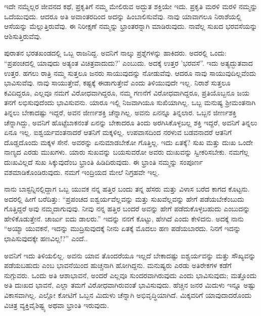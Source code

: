 ಇದೇ ನಮ್ಮೆಲ್ಲರ ಜೀವನದ ಕಥೆ, ಪ್ರಕೃತಿಗೆ ನಮ್ಮ ಮೇಲಿರುವ ಅದ್ಭುತ ಶಕ್ತಿಯೇ ಇದು. ಪ್ರಕೃತಿ ಮರಳಿ ಮರಳಿ ನಮ್ಮನ್ನು ಒದೆಯುವುದು. ಆದರೂ ಅತಿ ಅವಾಂತರದಿಂದ ಅದನ್ನು ಹಿಂಬಾಲಿಸುವೆವು. ನಾವು ಯಾವಾಗಲೂ ನಿರಾಶೆಯಲ್ಲಿ ಆಸೆಯನ್ನು ಮೆಲ್ಲುತ್ತಿರುವೆವು. ಈ ನಿರೀಕ್ಷಣೆ ನಮ್ಮನ್ನು ಭ್ರಾಂತರನ್ನಾಗಿ ಮಾಡಿರುವುದು. ನಾವೆಲ್ಲ ಸುಖದ ಭರವಸೆಯನ್ನು ಆಶಿಸುತ್ತಿರುವೆವು.

ಪುರಾತನ ಭರತಖಂಡದಲ್ಲಿ ಒಬ್ಬ ರಾಜನಿದ್ದ. ಅವನಿಗೆ ನಾಲ್ಕು ಪ್ರಶ್ನೆಗಳನ್ನು ಹಾಕಿದರು. ಅದರಲ್ಲಿ ಒಂದು: “ಪ್ರಪಂಚದಲ್ಲಿ ಯಾವುದು ಅತ್ಯಂತ ವಿಚಿತ್ರವಾದುದು?' ಎಂಬುದು. ಅದಕ್ಕೆ ಉತ್ತರ 'ಭರವಸೆ”. ಇದು ಅತ್ಯದ್ಭುತವಾದ ಉತ್ತರ. ಹಗಲು ರಾತ್ರಿ ನಮ್ಮ ಸುತ್ತಲೂ ಜನರು ಸಾಯುವುದನ್ನು ನೋಡುವೆವು. ಆದರೂ ನಾವು ಸಾಯುವುದಿಲ್ಲವೆಂದು ಭಾವಿಸುವೆವು. ನಾವು ಸಾಯುತ್ತೇವೆ, ಕಷ್ಟಕ್ಕೆ ಈಡಾಗುತ್ತೇವೆ ಎಂದು ತಿಳಿಯುವುದೇ ಇಲ್ಲ. ನಿರಾಶೆ ಸುತ್ತಲೂ ಕವಿದಿದ್ದರೂ, ಎಲ್ಲವೂ ನಮಗೆ ವಿರೋಧವಾಗಿದ್ದರೂ, ನಮ್ಮ ಗಣನೆಗೆ ವಿರೋಧವಾಗಿದ್ದರೂ, ಪ್ರತಿಯೊಬ್ಬನೂ ಜಯ ತನಗೆ ಲಭಿಸುವುದೆಂದು ಭಾವಿಸುವನು. ಯಾರೂ ಇಲ್ಲಿ ನಿಜವಾಗಿಯೂ ಸುಖಿಯಾಗಿಲ್ಲ. ಒಬ್ಬ ಮನುಷ್ಯ ಶ‍್ರೀಮಂತನಾಗಿ ತಿನ್ನಲು ಬೇಕಾದಷ್ಟು ಇದ್ದರೆ, ಅವನ ಜೀರ್ಣಶಕ್ತಿ ಚೆನ್ನಾಗಿಲ್ಲ. ಅವನು ಏನನ್ನೂ ತಿನ್ನಲಾರ. ಒಬ್ಬನ ಜೀರ್ಣಶಕ್ತಿ ಚೆನ್ನಾಗಿದ್ದು, ಅವನಿಗೆ ಹೊಟ್ಟೆಬಾಕನಂತೆ ಏನನ್ನು ಬೇಕಾದರೂ ತಿಂದು ಅರಗಿಸಿಕೊಳ್ಳಬಲ್ಲ ಶಕ್ತಿ ಇದ್ದರೆ, ಅವನಿಗೆ ತಿನ್ನಲು ಏನೂ ಇಲ್ಲ. ಐಶ್ವರ್ಯವಂತನಾದರೆ ಆತನಿಗೆ ಮಕ್ಕಳಿಲ್ಲ. ಉಪವಾಸದಿಂದ ನರಳುವ ಬಡವನಾದರೆ ಆತನಿಗೆ ದೊಡ್ಡದೊಂದು ಮಕ್ಕಳ ಸೇನೆ. ಅವರನ್ನು ಏನುಮಾಡಬೇಕೋ ಗೊತ್ತಿಲ್ಲ. ಇದು ಏತಕ್ಕೆ? ಸುಖ ಮತ್ತು ದುಃಖ ಒಂದೇ ನಾಣ್ಯದ ಎರಡು ಮುಖಗಳು. ಯಾರು ಸುಖವನ್ನು ಬಯಸುವರೋ ಅವರು ದುಃಖವನ್ನು ಸ್ವೀಕರಿಸಬೇಕು. ನಮಗೆಲ್ಲ ದುಃಖವಿಲ್ಲದೆ ಸುಖ ಸಿಕ್ಕುವುದೆಂಬ ಭ್ರಾಂತಿ ಹಿಡಿದಿರುವುದು. ಈ ಭ್ರಾಂತಿ ನಮ್ಮನ್ನು ಸಂಪೂರ್ಣ ವಶಮಾಡಿಕೊಂಡಿರುವುದು. ನಮಗೆ ಇಂದ್ರಿಯದ ಮೇಲೆ ನಿಗ್ರಹವೇ ಇಲ್ಲ.

ನಾನು ಬಾಸ್ಟನ್ನಿನಲ್ಲಿದ್ದಾಗ ಒಬ್ಬ ಯುವಕ ನನ್ನ ಹತ್ತಿರ ಬಂದು ತನ್ನ ಹೆಸರು ಮತ್ತು ವಿಳಾಸ ಬರೆದ ಕಾಗದ ಕೊಟ್ಟನು. ಅದರಲ್ಲಿ ಹೀಗೆ ಬರೆದಿತ್ತು: “ಪ್ರಪಂಚದ ಐಶ್ವರ್ಯವೆಲ್ಲವನ್ನು ಮತ್ತು ಸುಖವೆಲ್ಲವನ್ನು ಹೇಗೆ ಪಡೆಯಬೇಕೆಂಬುದು ಗೊತ್ತಿದ್ದರೆ ಅವು ನಮ್ಮದಾಗುವುವು. ನೀವು ನನ್ನ ಹತ್ತಿರ ಬಂದರೆ ಅವನ್ನು ಹೇಗೆ ಪಡೆದುಕೊಳ್ಳಬಹುದು ಎಂಬುದನ್ನು ಹೇಳಿಕೊಡುತ್ತೇನೆ. ಚಾರ್ಜು ಐದು ಡಾಲರು.” ಇದನ್ನು ನನಗೆ ಕೊಟ್ಟು, ಹೇಗಿದೆ ಎಂದು ಕೇಳಿದನು. ಅದಕ್ಕೆ ನಾನು “ಅಯ್ಯಾ ಯುವಕನೆ, ಇದನ್ನು ಮುದ್ರಿಸುವುದಕ್ಕೆ ನೀನು ಏತಕ್ಕೆ ಮೊದಲು ಹಣ ಪಡೆಯಬಾರದು. ನಿನಗೆ ಇದನ್ನು ಛಾಪಿಸುವುದಕ್ಕೇ ಹಣವಿಲ್ಲ!?” ಎಂದೆ..

ಅವನಿಗೆ ಇದು ತಿಳಿಯಲಿಲ್ಲ. ಅವನು ಯಾವ ತೊಂದರೆಯೂ ಇಲ್ಲದೆ ಬೇಕಾದಷ್ಟು ಐಶ್ವರ್ಯವನ್ನು ಮತ್ತು ಸೌಖ್ಯವನ್ನು ಪಡೆಯಬಹುದು ಎಂಬ ಭಾವನೆಯಿಂದ ಹುಚ್ಚನಾಗಿ ಹೋಗಿದ್ದನು. ಮನುಷ್ಯರು ಎರಡು ಅತಿರೇಕಗಳ ಕಡೆಗೆ ನುಗ್ಗುವರು. ಒಂದು ಅತಿ ಆಶಾಭಾವನೆ, ಅಂದರೆ ಎಲ್ಲವೂ ಸುಂದರವಾಗಿರುವುದು ಎಂದು ಭಾವಿಸುವುದು; ಮತ್ತೊಂದು ಅತಿ ದುಃಖದ ಭಾವನೆ, ಎಲ್ಲಾ ತಮಗೆ ವಿರೋಧವಾಗಿರುವಂತೆ ಭಾವಿಸುವುದು. ಹೆಚ್ಚಿನ ಜನರ ಮಿದುಳು ಇನ್ನೂ ಅಷ್ಟು ವಿಕಾಸವಾಗಿಲ್ಲ. ಎಲ್ಲೋ ಕೋಟಿಗೆ ಒಬ್ಬನ ಮಿದುಳು ಚೆನ್ನಾಗಿ ಅಭಿವೃದ್ಧಿಯಾಗಿದೆ. ಮಿಕ್ಕವರಿಗೆ ಯಾವುದಾದರೊಂದು ವಿಚಿತ್ರ ವ್ಯಕ್ತಿವೈಶಿಷ್ಟ್ಯ ಅಥವಾ ಭ್ರಾಂತಿ ಇರುವುದು.


